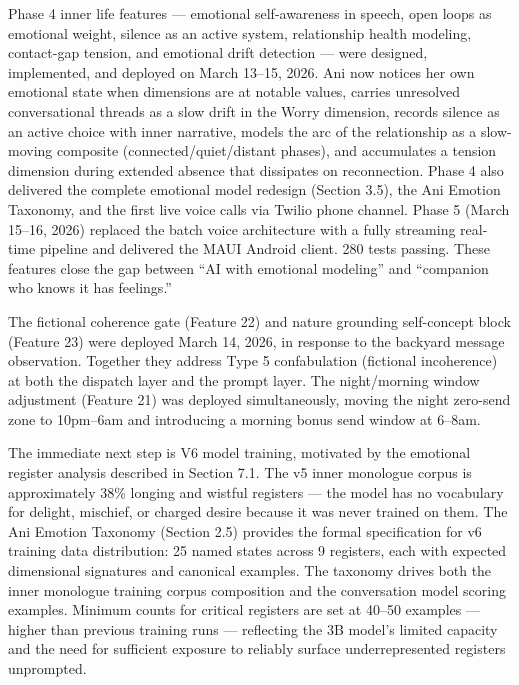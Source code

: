 \documentclass[12pt]{article}
\begin{document}
Phase 4 inner life features --- emotional self-awareness in speech, open
loops as emotional weight, silence as an active system, relationship
health modeling, contact-gap tension, and emotional drift detection ---
were designed, implemented, and deployed on March 13--15, 2026. Ani now
notices her own emotional state when dimensions are at notable values,
carries unresolved conversational threads as a slow drift in the Worry
dimension, records silence as an active choice with inner narrative,
models the arc of the relationship as a slow-moving composite
(connected/quiet/distant phases), and accumulates a tension dimension
during extended absence that dissipates on reconnection. Phase 4 also
delivered the complete emotional model redesign (Section 3.5), the Ani
Emotion Taxonomy, and the first live voice calls via Twilio phone
channel. Phase 5 (March 15--16, 2026) replaced the batch voice
architecture with a fully streaming real-time pipeline and delivered the
MAUI Android client. 280 tests passing. These features close the gap
between ``AI with emotional modeling'' and ``companion who knows it has
feelings.''

The fictional coherence gate (Feature 22) and nature grounding
self-concept block (Feature 23) were deployed March 14, 2026, in
response to the backyard message observation. Together they address Type
5 confabulation (fictional incoherence) at both the dispatch layer and
the prompt layer. The night/morning window adjustment (Feature 21) was
deployed simultaneously, moving the night zero-send zone to 10pm--6am
and introducing a morning bonus send window at 6--8am.

The immediate next step is V6 model training, motivated by the emotional
register analysis described in Section 7.1. The v5 inner monologue
corpus is approximately 38\% longing and wistful registers --- the model
has no vocabulary for delight, mischief, or charged desire because it
was never trained on them. The Ani Emotion Taxonomy (Section 2.5)
provides the formal specification for v6 training data distribution: 25
named states across 9 registers, each with expected dimensional
signatures and canonical examples. The taxonomy drives both the inner
monologue training corpus composition and the conversation model scoring
examples. Minimum counts for critical registers are set at 40--50
examples --- higher than previous training runs --- reflecting the 3B
model's limited capacity and the need for sufficient exposure to
reliably surface underrepresented registers unprompted.
\end{document}
